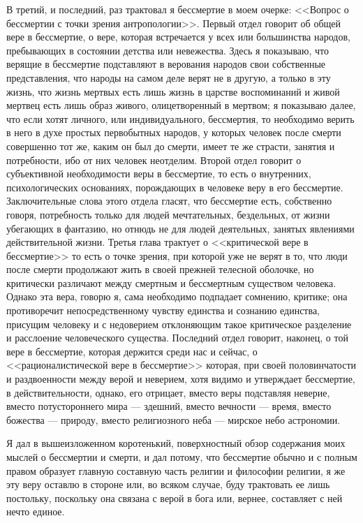 \documentclass[12pt]{article}
\begin{document}
В третий, и последний, раз трактовал я бессмертие в моем очерке: <<Вопрос о бессмертии с точки зрения антропологии>>. Первый отдел говорит об общей вере в бессмертие, о вере, которая встречается у всех или большинства народов, пребывающих в состоянии детства или невежества. Здесь я показываю, что верящие в бессмертие подставляют в верования народов свои собственные представления, что народы на самом деле верят не в другую, а только в эту жизнь, что жизнь мертвых есть лишь жизнь в царстве воспоминаний и живой мертвец есть лишь образ живого, олицетворенный в мертвом; я показываю далее, что если хотят личного, или индивидуального, бессмертия, то необходимо верить в него в духе простых первобытных народов, у которых человек после смерти совершенно тот же, каким он был до смерти, имеет те же страсти, занятия и потребности, ибо от них человек неотделим. Второй отдел говорит о субъективной необходимости веры в бессмертие, то есть о внутренних, психологических основаниях, порождающих в человеке веру в его бессмертие. Заключительные слова этого отдела гласят, что бессмертие есть, собственно говоря, потребность только для людей мечтательных, бездельных, от жизни убегающих в фантазию, но отнюдь не для людей деятельных, занятых явлениями действительной жизни. Третья глава трактует о <<критической вере в бессмертие>>  то есть о точке зрения, при которой уже не верят в то, что люди после смерти продолжают жить в своей прежней телесной оболочке, но критически различают между смертным и бессмертным существом человека. Однако эта вера, говорю я, сама необходимо подпадает сомнению, критике; она противоречит непосредственному чувству единства и сознанию единства, присущим человеку и с недоверием отклоняющим такое критическое разделение и расслоение человеческого существа. Последний отдел говорит, наконец, о той вере в бессмертие, которая держится среди нас и сейчас, о <<рационалистической вере в бессмертие>>  которая, при своей половинчатости и раздвоенности между верой и неверием, хотя видимо и утверждает бессмертие, в действительности, однако, его отрицает, вместо веры подставляя неверие, вместо потустороннего мира --- здешний, вместо вечности --- время, вместо божества --- природу, вместо религиозного неба --- мирское небо астрономии. 

Я дал в вышеизложенном коротенький, поверхностный обзор содержания моих мыслей о бессмертии и смерти, и дал потому, что бессмертие обычно и с полным правом образует главную составную часть религии и философии религии, я же эту веру оставлю в стороне или, во всяком случае, буду трактовать ее лишь постольку, поскольку она связана с верой в бога или, вернее, составляет с ней нечто единое. 
\end{document}
